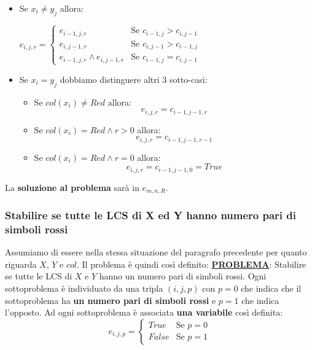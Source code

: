 \documentclass[12pt]{article}
\begin{document}
\begin{itemize}
    \item Se $x_i \neq y_j$ allora:
    \begin{center}
        $e_{i,j,r} = \begin{cases}
            e_{i-1, j, r} & \textrm{Se } c_{i-1, j} > c_{i, j-1} \\
            e_{i, j-1, r} & \textrm{Se } c_{i, j-1} > c_{i-1, j} \\
            e_{i-1,j,r} \land e_{i, j-1, r} & \textrm{Se } c_{i-1,j} = c_{i, j-1}
        \end{cases}$
    \end{center}
    \item Se $x_i = y_j$ dobbiamo distinguere altri 3 sotto-casi:
    \begin{itemize}
        \item Se $col(x_i) \neq Red$ allora:
        $$e_{i,j,r} = c_{i-1, j-1, r}$$
        \item Se $col(x_i) = Red \land r > 0$ allora:
        $$e_{i,j,r} = c_{i-1, j-1, r-1}$$
        \item Se $col(x_i) = Red \land r = 0$ allora:
        $$e_{i,j,r} = c_{i-1, j-1, 0} = True$$  
    \end{itemize}
\end{itemize}
La \textbf{soluzione al problema} sarà in $e_{m,n,R}$.
\subsubsection{Stabilire se tutte le LCS di X ed Y hanno numero pari di simboli rossi}
Assumiamo di essere nella stessa situazione del paragrafo precedente per quanto riguarda $X$, $Y$ e $col$.
Il problema è quindi così definito: \newline
\textbf{\underline{PROBLEMA}}: Stabilire se tutte le LCS di $X$ e $Y$ hanno un numero pari di simboli rossi. \newline
Ogni sottoproblema è individuato da una tripla $(i,j,p)$ con $p = 0$ che indica che il sottoproblema ha \textbf{un numero pari di simboli rossi}
e $p = 1$ che indica l'opposto. Ad ogni sottoproblema è associata \textbf{una variabile} così definita:
\begin{equation*}
    e_{i,j,p} = \begin{cases}
        True & \textrm{Se } p = 0 \\
        False & \textrm{Se } p = 1
    \end{cases}
\end{equation*}
\end{document}

